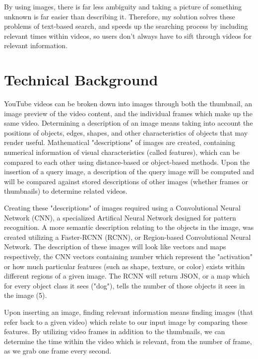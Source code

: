 \documentclass[10pt,twocolumn]{article}
\begin{document}
By using images, there is far less ambiguity and taking a picture of something unknown is far easier than describing it. Therefore, my solution solves these problems of text-based search, and speeds up the searching process by including relevant times within videos, so users don't always have to sift through videos for relevant information.


\section{Technical Background} 

YouTube videos can be broken down into images through both the thumbnail, an image preview of the video content, and the individual frames which make up the same video. Determining a description of an image means taking into account the positions of objects, edges, shapes, and other characteristics of objects that may render useful. Mathematical "descriptions" of images are created, containing numerical information of visual characteristics (called features), which can be compared to each other using distance-based or object-based methods. Upon the insertion of a query image, a description of the query image will be computed and will be compared against stored descriptions of other images (whether frames or thumbnails) to determine related videos.

Creating these "descriptions" of images required using a Convolutional Neural Network (CNN), a specialized Artifical Neural Network designed for pattern recognition. A more semantic description relating to the objects in the image, was created utilizing a Faster-RCNN (RCNN), or Region-based Convolutional Neural Network. The description of these images will look like vectors and maps respectively, the CNN vectors containing number which represent the "activation" or how much particular features (such as shape, texture, or color) exists within different regions of a given image. The RCNN will return JSON, or a map which for every object class it sees ("dog"), tells the number of those objects it sees in the image (5).

Upon inserting an image, finding relevant information means finding images (that refer back to a given video) which relate to our input image by comparing these features. By utilizing video frames in addition to the thumbnails, we can determine the time within the video which is relevant, from the number of frame, as we grab one frame every second.
\end{document}
